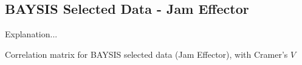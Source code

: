 \begin{appendices}
    
    \tocless\section{BAYSIS Selected Data - Jam Effector}
    \label{appendix_baysis_selected_duringJam}
    
    Explanation...
    
    
    
    \begin{sidewaystable}
    	\tiny
    	\setlength{\tabcolsep}{2pt}
    	\centering
    	
    	\caption{Correlation matrix for BAYSIS selected data (Jam Effector), with Cramer's $V$}
    	\label{table:appendix_correlation_matrix_selected_startJam_cramers}
    \end{sidewaystable}
    

\end{appendices}
